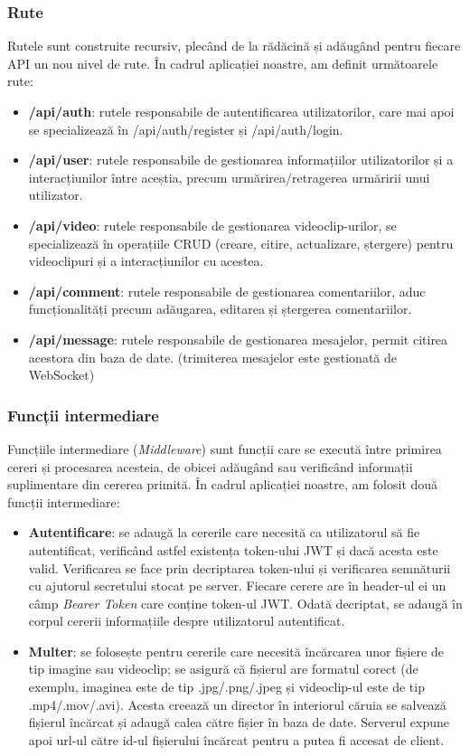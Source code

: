 \subsubsection{Rute}
Rutele sunt construite recursiv, plecând de la rădăcină și adăugând pentru fiecare API 
un nou nivel de rute. În cadrul aplicației noastre, am definit următoarele rute:

\begin{itemize}
    \item \textbf{/api/auth}: rutele responsabile de autentificarea utilizatorilor, care mai apoi 
    se specializează în /api/auth/register și /api/auth/login.
    \item \textbf{/api/user}: rutele responsabile de gestionarea informațiilor utilizatorilor și a 
    interacțiunilor între aceștia, precum urmărirea/retragerea urmăririi unui utilizator.
    \item \textbf{/api/video}: rutele responsabile de gestionarea videoclip-urilor, se specializează
    în operațiile CRUD (creare, citire, actualizare, ștergere) pentru videoclipuri și a interacțiunilor cu acestea.
    \item \textbf{/api/comment}: rutele responsabile de gestionarea comentariilor, aduc funcționalități
    precum adăugarea, editarea și ștergerea comentariilor.
    \item \textbf{/api/message}: rutele responsabile de gestionarea mesajelor, permit citirea acestora
    din baza de date. (trimiterea mesajelor este gestionată de WebSocket)
\end{itemize}

\subsubsection{Funcții intermediare}
Funcțiile intermediare (\textit{Middleware}) sunt funcții care se execută între primirea cereri
și procesarea acesteia, de obicei adăugând sau verificând informații suplimentare din cererea
primită. În cadrul aplicației noastre, am folosit două funcții intermediare:
\begin{itemize}
    \item \textbf{Autentificare}: se adaugă la cererile care necesită ca utilizatorul să fie
    autentificat, verificând astfel existența token-ului JWT și dacă acesta este valid. Verificarea
    se face prin decriptarea token-ului și verificarea semnăturii cu ajutorul secretului stocat
    pe server. Fiecare cerere are în header-ul ei un câmp \textit{Bearer Token} care conține
    token-ul JWT. Odată decriptat, se adaugă în corpul cererii informațiile despre
    utilizatorul autentificat.
    \item \textbf{Multer}: se folosește pentru cererile care necesită încărcarea unor
    fișiere de tip imagine sau videoclip; se asigură că fișierul are formatul corect
    (de exemplu, imaginea este de tip .jpg/.png/.jpeg și videoclip-ul este de tip .mp4/.mov/.avi).
    Acesta creează un director în interiorul căruia se salvează fișierul încărcat și adaugă
    calea către fișier în baza de date. Serverul expune apoi url-ul către id-ul fișierului
    încărcat pentru a putea fi accesat de client.
    
\end{itemize}

